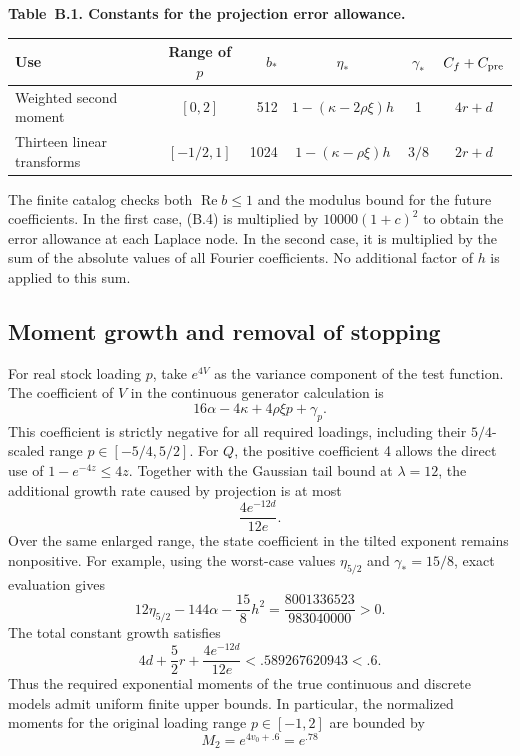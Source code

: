 \documentclass[11pt,a4paper]{article}
\begin{document}
\noindent\textbf{Table~B.1. Constants for the projection error allowance.}

\begingroup
\small
\setlength{\tabcolsep}{3pt}
\renewcommand{\arraystretch}{1.2}
\begin{tabularx}{\textwidth}{@{}>{\raggedright\arraybackslash}X c r c c c@{}}
\toprule
Use & Range of \(p\) & \(b_*\) & \(\eta_*\) & \(\gamma_*\) & \(C_f+C_{\rm pre}\) \\
\midrule
Weighted second moment & \([0,2]\) & 512 & \(1-(\kappa-2\rho\xi)h\) & 1 & \(4r+d\) \\
Thirteen linear transforms & \([-1/2,1]\) & 1024 & \(1-(\kappa-\rho\xi)h\) & \(3/8\) & \(2r+d\) \\
\bottomrule
\end{tabularx}
\endgroup

The finite catalog checks both \(\operatorname{Re}b\le1\) and the modulus bound for the future coefficients. In the first case, (B.4) is multiplied by \(10000(1+c)^2\) to obtain the error allowance at each Laplace node. In the second case, it is multiplied by the sum of the absolute values of all Fourier coefficients. No additional factor of \(h\) is applied to this sum.

\subsection{Moment growth and removal of stopping}

For real stock loading \(p\), take \(e^{4V}\) as the variance component of the test function. The coefficient of \(V\) in the continuous generator calculation is
\[
16\alpha-4\kappa+4\rho\xi p+\gamma_p.
\tag{B.5}
\]
This coefficient is strictly negative for all required loadings, including their \(5/4\)-scaled range \(p\in[-5/4,5/2]\). For \(Q\), the positive coefficient 4 allows the direct use of \(1-e^{-4z}\le4z\). Together with the Gaussian tail bound at \(\lambda=12\), the additional growth rate caused by projection is at most
\[
\frac{4e^{-12d}}{12e}.
\]
Over the same enlarged range, the state coefficient in the tilted exponent remains nonpositive. For example, using the worst-case values \(\eta_{5/2}\) and \(\gamma_*=15/8\), exact evaluation gives
\[
12\eta_{5/2}-144\alpha-\frac{15}{8}h^2
=\frac{8001336523}{983040000}>0.
\]
The total constant growth satisfies
\[
4d+\frac52r+\frac{4e^{-12d}}{12e}
<.589267620943<.6.
\tag{B.6}
\]
Thus the required exponential moments of the true continuous and discrete models admit uniform finite upper bounds. In particular, the normalized moments for the original loading range \(p\in[-1,2]\) are bounded by
\[
M_2=e^{4v_0+.6}=e^{.78}
\tag{B.7}
\]
\end{document}
